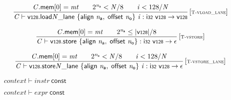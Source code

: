 $$
\begin{array}{@{}c@{}}\displaystyle
\frac{
{\mathit{C}}.\mathsf{mem}{}[0] = {\mathit{mt}}
 \qquad
{2^{{\mathit{n}}_{{\mathsf{a}}}}} < {\mathit{N}} / 8
 \qquad
{\mathit{i}} < 128 / {\mathit{N}}
}{
{\mathit{C}} \vdash {{{\mathsf{v{\scriptstyle128}.load}}{{\mathit{N}}}}{\mathsf{\_}}}{\mathsf{lane}}~\{ \begin{array}[t]{@{}l@{}}
\mathsf{align}~{\mathit{n}}_{{\mathsf{a}}},\; \mathsf{offset}~{\mathit{n}}_{{\mathsf{o}}} \}\end{array}~{\mathit{i}} : \mathsf{i{\scriptstyle32}}~\mathsf{v{\scriptstyle128}} \rightarrow \mathsf{v{\scriptstyle128}}
} \, {[\textsc{\scriptsize T{-}vload\_lane}]}
\qquad
\end{array}
$$

$$
\begin{array}{@{}c@{}}\displaystyle
\frac{
{\mathit{C}}.\mathsf{mem}{}[0] = {\mathit{mt}}
 \qquad
{2^{{\mathit{n}}_{{\mathsf{a}}}}} \leq {|\mathsf{v{\scriptstyle128}}|} / 8
}{
{\mathit{C}} \vdash \mathsf{v{\scriptstyle128}.store}~\{ \begin{array}[t]{@{}l@{}}
\mathsf{align}~{\mathit{n}}_{{\mathsf{a}}},\; \mathsf{offset}~{\mathit{n}}_{{\mathsf{o}}} \}\end{array} : \mathsf{i{\scriptstyle32}}~\mathsf{v{\scriptstyle128}} \rightarrow \epsilon
} \, {[\textsc{\scriptsize T{-}vstore}]}
\qquad
\end{array}
$$

$$
\begin{array}{@{}c@{}}\displaystyle
\frac{
{\mathit{C}}.\mathsf{mem}{}[0] = {\mathit{mt}}
 \qquad
{2^{{\mathit{n}}_{{\mathsf{a}}}}} < {\mathit{N}} / 8
 \qquad
{\mathit{i}} < 128 / {\mathit{N}}
}{
{\mathit{C}} \vdash {{{\mathsf{v{\scriptstyle128}.store}}{{\mathit{N}}}}{\mathsf{\_}}}{\mathsf{lane}}~\{ \begin{array}[t]{@{}l@{}}
\mathsf{align}~{\mathit{n}}_{{\mathsf{a}}},\; \mathsf{offset}~{\mathit{n}}_{{\mathsf{o}}} \}\end{array}~{\mathit{i}} : \mathsf{i{\scriptstyle32}}~\mathsf{v{\scriptstyle128}} \rightarrow \epsilon
} \, {[\textsc{\scriptsize T{-}vstore\_lane}]}
\qquad
\end{array}
$$

\vspace{1ex}

$\boxed{{\mathit{context}} \vdash {\mathit{instr}}~\mathsf{const}}$

$\boxed{{\mathit{context}} \vdash {\mathit{expr}}~\mathsf{const}}$

